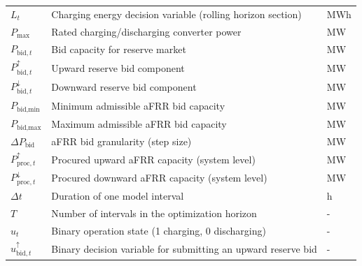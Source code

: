\begin{longtable}{@{}>{\raggedright\arraybackslash}p{} >{\raggedright\arraybackslash}p{} >{\raggedright\arraybackslash}p{}@{}}
    $L_t$                                     & Charging energy decision variable (rolling horizon section)                          & MWh           \\
    $P_{\text{max}}$                          & Rated charging/discharging converter power                                           & MW            \\
    $P_{\text{bid},t}$                        & Bid capacity for reserve market                                                      & MW            \\
    $P_{\text{bid},t}^{\uparrow}$             & Upward reserve bid component                                                         & MW            \\
    $P_{\text{bid},t}^{\downarrow}$           & Downward reserve bid component                                                       & MW            \\
    $P_{\text{bid,min}}$                      & Minimum admissible aFRR bid capacity                                                 & MW            \\
    $P_{\text{bid,max}}$                      & Maximum admissible aFRR bid capacity                                                 & MW            \\
    $\Delta P_{\text{bid}}$                   & aFRR bid granularity (step size)                                                     & MW            \\
    $P_{\text{proc},t}^{\uparrow}$            & Procured upward aFRR capacity (system level)                                         & MW            \\
    $P_{\text{proc},t}^{\downarrow}$          & Procured downward aFRR capacity (system level)                                       & MW            \\
    $\Delta t$                                & Duration of one model interval                                                       & h             \\
    $T$                                       & Number of intervals in the optimization horizon                                      & -             \\
    $u_t$                                     & Binary operation state (1 charging, 0 discharging)                                   & -             \\
    $u_{\text{bid},t}^{\uparrow}$             & Binary decision variable for submitting an upward reserve bid                        & -             \\

\end{longtable}
